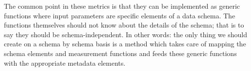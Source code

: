 The common point in these metrics is that they can be implemented as generic functions where input parameters are specific elements of a data schema. The functions themselves should not know about the details of the schema; that is to say they should be schema-independent. In other words: the only thing we should create on a schema by schema basis is a method which takes care of mapping the schema elements and measurement functions and feeds these generic functions with the appropriate metadata elements.
